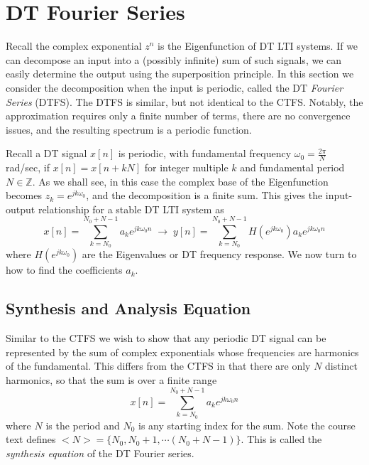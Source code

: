 \section{DT Fourier Series}

Recall the complex exponential $z^n$ is the Eigenfunction of DT LTI systems. If we can decompose an input into a (possibly infinite) sum of such signals, we can easily determine the output using the superposition principle. In this section we consider the decomposition when the input is periodic, called the DT \emph{Fourier Series} (DTFS). The DTFS is similar, but not identical to the CTFS. Notably, the approximation requires only a finite number of terms, there are no convergence issues, and the resulting spectrum is a periodic function.

Recall a DT signal $x[n]$ is periodic, with fundamental frequency $\omega_0 = \frac{2\pi}{N}$ rad/sec, if $x[n] = x[n+kN]$ for integer multiple $k$ and fundamental period $N \in \mathbb{Z}$. As we shall see, in this case the complex base of the Eigenfunction becomes $z_k = e^{jk\omega_0}$, and the decomposition is a finite sum. This gives the input-output relationship for a stable DT LTI system as 
\[
x[n] = \sum\limits_{k = N_0}^{N_0 + N-1} a_k e^{jk\omega_0n} \;\longrightarrow\;  y[n] = \sum\limits_{k = N_0}^{N_0 + N-1} H\left(e^{j k\omega_0}\right) a_k e^{jk\omega_0 n} 
\]
where $H\left(e^{j k\omega_0}\right)$ are the Eigenvalues or DT frequency response. We now turn to how to find the coefficients $a_k$.

\subsection{Synthesis and Analysis Equation}

Similar to the CTFS we wish to show that any periodic DT signal can be represented by the sum of complex exponentials whose frequencies are harmonics of the fundamental. This differs from the CTFS in that there are only $N$ distinct harmonics, so that the sum is over a finite range
\[  
\boxed{x[n] = \sum\limits_{k = N_0}^{N_0 + N-1} a_k e^{jk\omega_0n} }
\]
where $N$ is the period and $N_0$ is any starting index for the sum. Note the course text defines $<N> = \{ N_0, N_0 + 1,  \cdots (N_0 + N-1) \}$. This is called the \emph{synthesis equation} of the DT Fourier series.

